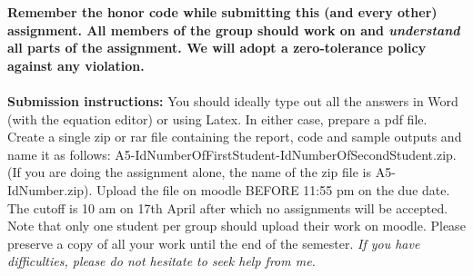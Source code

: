 \documentclass[11pt]{article}
\begin{document}
\maketitle

\textbf{Remember the honor code while submitting this (and every other) assignment. All members of the group should work on and \emph{understand} all parts of the assignment. We will adopt a \textbf{zero-tolerance policy} against any violation.}
\\
\\
\noindent\textbf{Submission instructions:} You should ideally type out all the answers in Word (with the equation editor) or using Latex. In either case, prepare a pdf file. Create a single zip or rar file containing the report, code and sample outputs and name it as follows: A5-IdNumberOfFirstStudent-IdNumberOfSecondStudent.zip. (If you are doing the assignment alone, the name of the zip file is A5-IdNumber.zip). Upload the file on moodle BEFORE 11:55 pm on the due date. The cutoff is 10 am on 17th April after which no assignments will be accepted. Note that only one student per group should upload their work on moodle. Please preserve a copy of all your work until the end of the semester. \emph{If you have difficulties, please do not hesitate to seek help from me.} 
\end{document}
